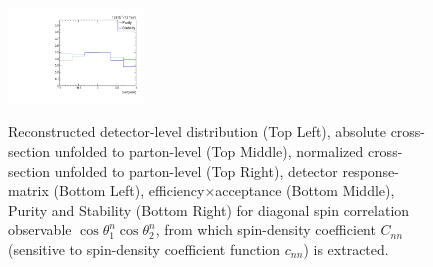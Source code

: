 \begin{figure}[htb]
\begin{center}
 \includegraphics[width=0.32\textwidth]{fig_fullRun2UL/unfolding/combined/PurStab_c_nn.pdf} \\
\caption{Reconstructed detector-level distribution (Top Left), absolute cross-section unfolded to parton-level (Top Middle), normalized cross-section unfolded to parton-level (Top Right), detector response-matrix (Bottom Left), efficiency$\times$acceptance (Bottom Middle), Purity and Stability (Bottom Right) for diagonal spin correlation observable $\cos\theta_{1}^{n}\cos\theta_{2}^{n}$, from which spin-density coefficient $C_{nn}$ (sensitive to spin-density coefficient function $c_{n n}$) is extracted.}
\label{fig:c_nn}
\end{center}
\end{figure}
\clearpage
